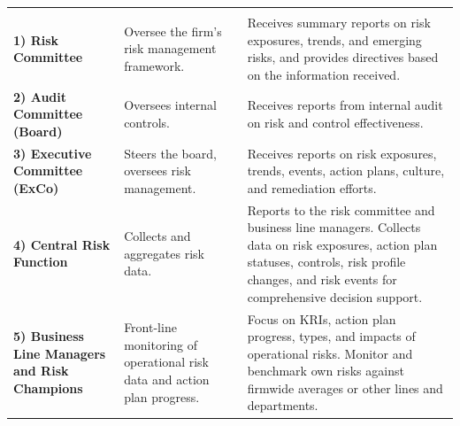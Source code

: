 


\noindent\begin{minipage}{\textwidth}
\renewcommand{\arraystretch}{1.3}
\begin{tabularx}{\textwidth}{@{}L{0.26\textwidth}YY@{}}
  &  & \\
{\tabfont \textbf{1) Risk Committee}} &
{\tabfont Oversee the firm's risk management framework.} &
{\tabfont Receives summary reports on risk exposures, trends, and emerging risks,
and provides directives based on the information received.}\\
{\tabfont \textbf{2) Audit Committee (Board)}} &
{\tabfont Oversees internal controls.} &
{\tabfont Receives reports from internal audit on risk and control
effectiveness.}\\
{\tabfont \textbf{3) Executive Committee (ExCo)}} &
{\tabfont Steers the board, oversees risk management.} &
{\tabfont Receives reports on risk exposures, trends, events, action plans,
culture, and remediation efforts.}\\
{\tabfont \textbf{4) Central Risk Function}} &
{\tabfont Collects and aggregates risk data.} &
{\tabfont Reports to the risk committee and business line managers. Collects data
on risk exposures, action plan statuses, controls, risk profile changes, and risk
events for comprehensive decision support.}\\
{\tabfont \textbf{5) Business Line Managers and Risk Champions}} &
{\tabfont Front-line monitoring of operational risk data and action plan
progress.} &
{\tabfont Focus on KRIs, action plan progress, types, and impacts of operational
risks. Monitor and benchmark own risks against firmwide averages or other lines
and departments.}\\
\end{tabularx}
\end{minipage}


